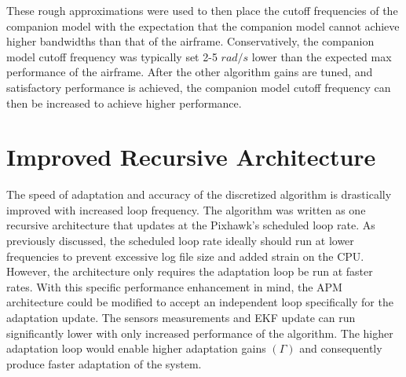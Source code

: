 These rough approximations were used to then place the cutoff frequencies of the companion model with the expectation that the companion model cannot achieve higher bandwidths than that of the airframe.  Conservatively, the companion model cutoff frequency was typically set 2-5 $rad/s$ lower than the expected max performance of the airframe.  After the other algorithm gains are tuned, and satisfactory performance is achieved, the companion model cutoff frequency can then be increased to achieve higher performance.

\section{Improved Recursive Architecture}

The speed of adaptation and accuracy of the discretized \Lone algorithm is drastically improved with increased loop frequency.  The algorithm was written as one recursive architecture that updates at the Pixhawk's scheduled loop rate.  As previously discussed, the scheduled loop rate ideally should run at lower frequencies to prevent excessive log file size and added strain on the CPU.  However, the \Lone architecture only requires the adaptation loop be run at faster rates.  With this specific performance enhancement in mind, the \ac{APM} architecture could be modified to accept an independent loop specifically for the \Lone adaptation update.  The sensors measurements and \ac{EKF} update can run significantly lower with only increased performance of the algorithm.  The higher adaptation loop would enable higher adaptation gains $(\Gamma)$ and consequently produce faster adaptation of the system.

